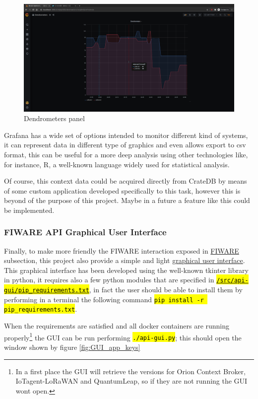 \documentclass[11pt,a4paper,dvipsnames,twoside]{article}
\newcommand{\cmd}[1] {\hl{\texttt{#1}}}
\begin{document}
\begin{figure}[ht]
  \centering
  \includegraphics[width=.9\textwidth]{../pictures/Grafana_final_panel.png}
  \caption{Dendrometers panel}
  \label{fig:final_panel}
\end{figure}

Grafana has a wide set of options intended to monitor different kind of systems, it can represent data in different type of graphics and even allows export to csv format, this can be useful for a more deep analysis using other technologies like, for instance, R, a well-known language widely used for statistical analysis.

Of course, this context data could be acquired directly from CrateDB by means of some custom application developed specifically to this task, however this is beyond of the purpose of this project. Maybe in a future a feature like this could be implemented. 

\subsubsection{FIWARE API Graphical User Interface}\label{sssec:API_GUI}
Finally, to make more friendly the FIWARE interaction exposed in \hyperref[sssec:FIWARE]{FIWARE} subsection, this project also provide a simple and light \href{https://github.com/WyRe/lora-arduino-dendrometer/blob/master/src/api-gui/api-gui.py}{graphical user interface}. This graphical interface has been developed using the well-known tkinter library in python, it requires also a few python modules that are specified in \href{https://github.com/WyRe/lora-arduino-dendrometer/blob/master/src/api-gui/pip_requirements.txt}{\cmd{/src/api-gui/pip\_requirements.txt}}, in fact the user should be able to install them by performing in a terminal the following command \cmd{pip install -r pip\_requirements.txt}.

When the requirements are satisfied and all docker containers are running properly\footnote{In a first place the GUI will retrieve the versions for Orion Context Broker, IoTagent-LoRaWAN and QuantumLeap, so if they are not running the GUI wont open.} the GUI can be run performing \cmd{./api-gui.py}; this should open the window shown by figure \ref{fig:GUI_app_keys}
\end{document}
